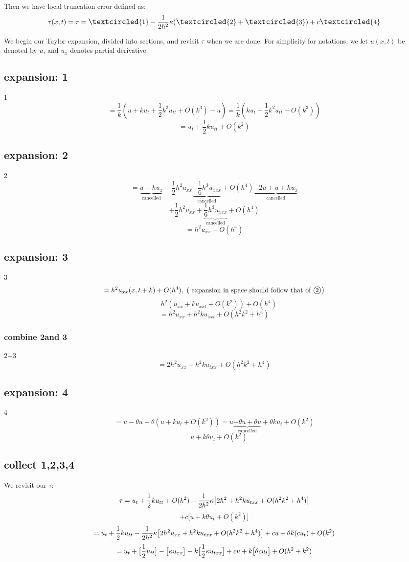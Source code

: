 \documentclass[12pt]{article}
\newcommand{\uno}{\large \textcircled{\small{1}}}
\newcommand{\dos}{\large\textcircled{\small{2}}}
\newcommand{\tres}{\large\textcircled{\small{3}}}
\newcommand{\yonn}{\large\textcircled{\small{4}}} %
\newcommand{\cancels}[1]{\underbrace{#1}_\textrm{cancelled}}
\begin{document}
Then we have local truncation error defined as:
$$
	\tau(x,t)=\tau
	= \uno - \frac{1}{2h^2}\bk (\dos + \tres) + c\yonn
$$

We begin our Taylor expansion, divided into sections, and revisit $\tau$ when we are done. For simplicity for notations, we let $u(x,t)$ be denoted by $u$, and $u_x$ denotes partial derivative.
\subsection{expansion: \uno}
\uno
$$
	= \frac{1}{k}(u+ku_t+\frac12 k^2u_{tt}+O(k^3)-u)
	= \frac{1}{k}(ku_t+\frac12 k^2u_{tt}+O(k^3))
$$
$$
	= u_t + \frac12 ku_{tt} + O(k^2)
$$
\subsection{expansion: \dos}
\dos
$$
	= \cancels{u - hu_x} + \frac12 h^2u_{xx} \cancels{- \frac16 h^3 u_{xxx}} + O(h^4) \cancels{- 2u + u + hu_x} 
$$
$$
	+ \frac12 h^2 u_{xx} + \cancels{\frac16 h^3 u_{xxx}} + O(h^4)
$$
$$
	= h^2u_{xx}+O(h^4)
$$

\subsection{expansion: \tres}
\tres
$$
	= h^2u_{xx}(x,t+k) + O(h^4), \text{ ( expansion in space should follow that of \dos )}
$$
$$
	= h^2(u_{xx} + ku_{xxt} + O(k^2)) + O(h^4)
$$
$$
	= h^2u_{xx} + h^2ku_{xxt} + O(h^2k^2 + h^4)
$$
\subsubsection{combine \dos and \tres}
\dos $+$\tres
$$
	= 2h^2u_{xx} + h^2ku_{txx} + O(h^2k^2 + h^4)
$$

\subsection{expansion: \yonn}
\yonn
$$
	= u - \theta u + \theta(u + ku_t + O(k^2))
	= u \cancels{- \theta u + \theta u} + \theta ku_t + O(k^2)
$$
$$
	= u + k\theta u_t + O(k^2)
$$

\subsection{collect \uno,\dos,\tres,\yonn}
We revisit our $\tau$:
$$
	\tau = u_t + \frac12 ku_{tt} + O(k^2) - \frac{1}{2h^2} \kappa \big[ 2h^2 + h^2ku_{txx} + O(h^2k^2+h^4)\big]
$$
$$
	+ c\big[u+k\theta u_t + O(k^2) \big]
$$
$$
	= u_t + \frac12 ku_{tt} - \frac{1}{2h^2}\kappa \big[ 2h^2u_{xx} + h^2ku_{txx} + O(h^2k^2+h^4)\big] + cu + \theta k (cu_t) + O(k^2)
$$
$$
	= u_t + \big[ \frac{1}{2}u_{tt} \big] - \big[ \kappa u_{xx} \big] - k\big[ \frac12 \kappa u_{txx} \big] + cu + k\big[ \theta cu_t \big] + O(h^2+k^2)
$$
\end{document}
